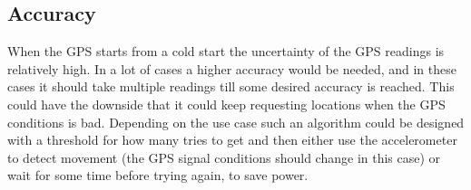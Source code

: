 \subsection{Accuracy}
When the GPS starts from a cold start the uncertainty of the GPS readings is relatively high. In a lot of cases a higher accuracy would be needed, and in these cases it should take multiple readings till some desired accuracy is reached. This could have the downside that it could keep requesting locations when the GPS conditions is bad. Depending on the use case such an algorithm could be designed with a threshold for how many tries to get and then either use the accelerometer to detect movement (the GPS signal conditions should change in this case) or wait for some time before trying again, to save power.